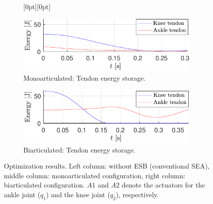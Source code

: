 \documentclass[letterpaper, 10 pt, conference]{ieeeconf}  %
\begin{document}
\begin{figure}[ht]
		\begin{subfigure}[t]{0.32\linewidth}
			\centering
			\raisebox{0pt}[0pt][0pt]{%
			}
		\end{subfigure}
		\begin{subfigure}[t]{0.32\linewidth}
			\includegraphics[width=\linewidth]{mono/ESB_storage}
			\caption{Monoarticulated: Tendon energy storage.}
			\label{fig:mono_ESB}
		\end{subfigure}
		\begin{subfigure}[t]{0.32\linewidth}
			\includegraphics[width=\linewidth]{bi/ESB_storage}
			\caption{Biarticulated: Tendon energy storage.}
			\label{fig:bi_ESB}
		\end{subfigure}
		
		\caption{Optimization results. Left column: without ESB (conventional SEA), middle column: monoarticulated configuration, right column: biarticulated configuration. $A1$ and $A2$ denote the actuators for the ankle joint ($q_1$) and the knee joint ($q_2$), respectively.}
		\label{fig:opt_results}
	\end{figure}
	
	
\end{document}
